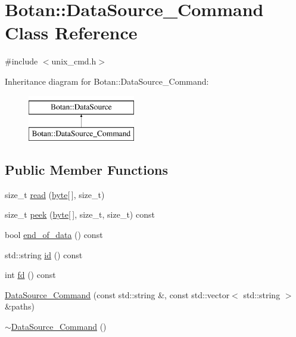 \hypertarget{classBotan_1_1DataSource__Command}{\section{Botan\-:\-:Data\-Source\-\_\-\-Command Class Reference}
\label{classBotan_1_1DataSource__Command}
}


{\ttfamily \#include $<$unix\-\_\-cmd.\-h$>$}

Inheritance diagram for Botan\-:\-:Data\-Source\-\_\-\-Command\-:\begin{figure}[H]
\begin{center}
\leavevmode
\includegraphics[height=2.000000cm]{classBotan_1_1DataSource__Command}
\end{center}
\end{figure}
\subsection*{Public Member Functions}
\begin{DoxyCompactItemize}
\item 
size\-\_\-t \hyperlink{classBotan_1_1DataSource__Command_a233a70ffbab962c8db639d5a50e3c5d3}{read} (\hyperlink{namespaceBotan_a7d793989d801281df48c6b19616b8b84}{byte}\mbox{[}$\,$\mbox{]}, size\-\_\-t)
\item 
size\-\_\-t \hyperlink{classBotan_1_1DataSource__Command_a2824b393057286ed8d34a2ffe3ebf720}{peek} (\hyperlink{namespaceBotan_a7d793989d801281df48c6b19616b8b84}{byte}\mbox{[}$\,$\mbox{]}, size\-\_\-t, size\-\_\-t) const 
\item 
bool \hyperlink{classBotan_1_1DataSource__Command_aec9a4df47802e6686d8348f7f88336f4}{end\-\_\-of\-\_\-data} () const 
\item 
std\-::string \hyperlink{classBotan_1_1DataSource__Command_a21dcc3ff8f8e4ea31735c25b0f838e53}{id} () const 
\item 
int \hyperlink{classBotan_1_1DataSource__Command_abe208cf792bf5ac02478f4aff0a08759}{fd} () const 
\item 
\hyperlink{classBotan_1_1DataSource__Command_aafd79b43c06ee3343e51a76ceadb1ed1}{Data\-Source\-\_\-\-Command} (const std\-::string \&, const std\-::vector$<$ std\-::string $>$ \&paths)
\item 
\hyperlink{classBotan_1_1DataSource__Command_a2592ab5bec4fd53fedc8a28f825a63e1}{$\sim$\-Data\-Source\-\_\-\-Command} ()
\end{DoxyCompactItemize}


